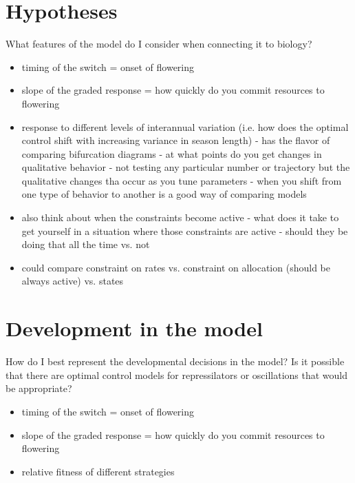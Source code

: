 \documentclass[12pt, oneside]{article}   	%
\begin{document}
 

\section*{Hypotheses}

\noindent What features of the model do I consider when connecting it to biology?

\begin{itemize}

\item timing of the switch = onset of flowering

\item slope of the graded response = how quickly do you commit resources to flowering

\item response to different levels of interannual variation (i.e. how does the optimal control shift with increasing variance in season length) - has the flavor of comparing bifurcation diagrams - at what points do you get changes in qualitative behavior - not testing any particular number or trajectory but the qualitative changes tha occur as you tune parameters - when you shift from one type of behavior to another is a good way of comparing models

\item also think about when the constraints become active - what does it take to get yourself in a situation where those constraints are active - should they be doing that all the time vs. not

\item could compare constraint on rates vs. constraint on allocation (should be always active) vs. states

\end{itemize}

\section*{Development in the model}

\noindent How do I best represent the developmental decisions in the model? Is it possible that there are optimal control models for repressilators or oscillations that would be appropriate?

\begin{itemize}

\item timing of the switch = onset of flowering

\item slope of the graded response = how quickly do you commit resources to flowering

\item relative fitness of different strategies

\end{itemize}
\end{document}
